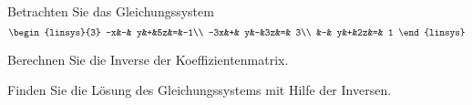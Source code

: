 %
%
Betrachten Sie das Gleichungssystem
\[
\begin{linsys}{3}
 -x&-& y&+&5z&=&-1\\
-3x&+& y&-&3z&=& 3\\
   &-& y&+&2z&=& 1
\end{linsys}
\]
\begin{teilaufgaben}
\item Berechnen Sie die Inverse der Koeffizientenmatrix.
\item Finden Sie die Lösung des Gleichungssystems mit Hilfe der Inversen.
\end{teilaufgaben}


